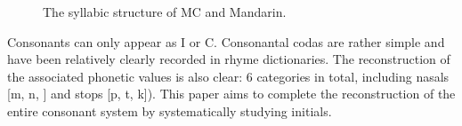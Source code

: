 
\begin{figure}[hbtp]
  \centering

  \caption{The syllabic structure of MC and Mandarin.}
  \label{fig:syllabic-structure}
\end{figure}


Consonants can only appear as I or C. %
Consonantal codas are rather simple and have been relatively clearly recorded in rhyme dictionaries. 
The reconstruction of the associated phonetic values is also clear: 6 categories in total, including nasals [m, n, \textipa{\ng}] and stops [p, t, k]). 
This paper aims to complete the reconstruction of the entire consonant system by systematically studying initials.

